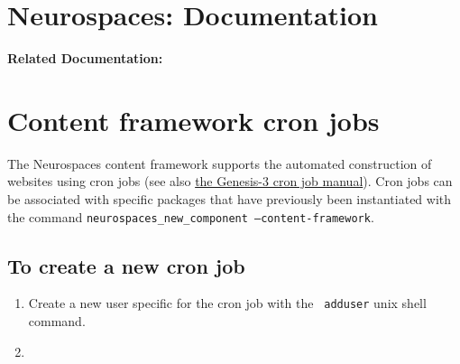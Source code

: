 \documentclass[12pt]{article}
\begin{document}
\section*{Neurospaces: Documentation}

{\bf Related Documentation:}

\section*{Content framework cron jobs}

The Neurospaces content framework supports the automated construction
of websites using cron jobs (see also
\href{http://www.genesis-sim.org/userdocs/neurospaces-cron/neurospaces-cron.html}{the
  Genesis-3 cron job manual}).  Cron jobs can be associated with
specific packages that have previously been instantiated with the
command {\tt neurospaces\_new\_component --content-framework}.

\subsection{To create a new cron job}

\begin{enumerate}
\item Create a new user specific for the cron job with the {\tt
    adduser} unix shell command.
\item 
\end{enumerate}








\end{document}
